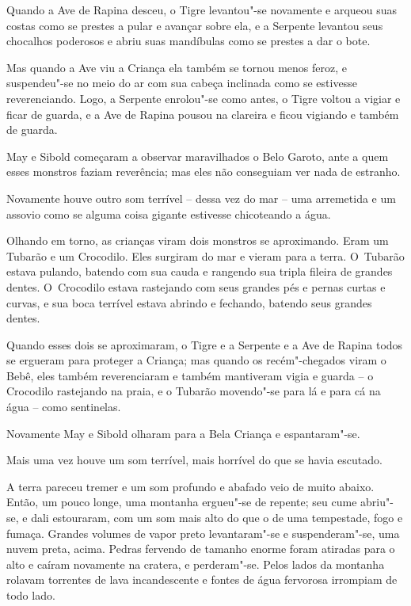 Quando a Ave de Rapina desceu, o Tigre levantou"-se novamente e arqueou
suas costas como se prestes a pular e avançar sobre ela, e a Serpente
levantou seus chocalhos poderosos e abriu suas mandíbulas como se
prestes a dar o bote.

Mas quando a Ave viu a Criança ela também se tornou menos feroz, e
suspendeu"-se no meio do ar com sua cabeça inclinada como se estivesse
reverenciando. Logo, a Serpente enrolou"-se como antes, o Tigre voltou a
vigiar e ficar de guarda, e a Ave de Rapina pousou na clareira e ficou
vigiando e também de guarda.

May e Sibold começaram a observar maravilhados o Belo Garoto, ante a
quem esses monstros faziam reverência; mas eles não conseguiam ver nada
de estranho.

Novamente houve outro som terrível -- dessa vez do mar -- uma arremetida
e um assovio como se alguma coisa gigante estivesse chicoteando a água.

Olhando em torno, as crianças viram dois monstros se aproximando. Eram
um Tubarão e um Crocodilo. Eles surgiram do mar e vieram para a terra. O~Tubarão estava pulando, batendo com sua cauda e rangendo sua tripla
fileira de grandes dentes. O~Crocodilo estava rastejando com seus
grandes pés e pernas curtas e curvas, e sua boca terrível estava abrindo
e fechando, batendo seus grandes dentes.

Quando esses dois se aproximaram, o Tigre e a Serpente e a Ave de Rapina
todos se ergueram para proteger a Criança; mas quando os recém"-chegados
viram o Bebê, eles também reverenciaram e também mantiveram vigia e
guarda -- o Crocodilo rastejando na praia, e o Tubarão movendo"-se para
lá e para cá na água -- como sentinelas.

Novamente May e Sibold olharam para a Bela Criança e espantaram"-se.

Mais uma vez houve um som terrível, mais horrível do que se havia
escutado.

A terra pareceu tremer e um som profundo e abafado veio de muito abaixo.
Então, um pouco longe, uma montanha ergueu"-se de repente; seu cume
abriu"-se, e dali estouraram, com um som mais alto do que o de uma
tempestade, fogo e fumaça. Grandes volumes de vapor preto levantaram"-se
e suspenderam"-se, uma nuvem preta, acima. Pedras fervendo de tamanho
enorme foram atiradas para o alto e caíram novamente na cratera, e
perderam"-se. Pelos lados da montanha rolavam torrentes de lava
incandescente e fontes de água fervorosa irrompiam de todo lado.

